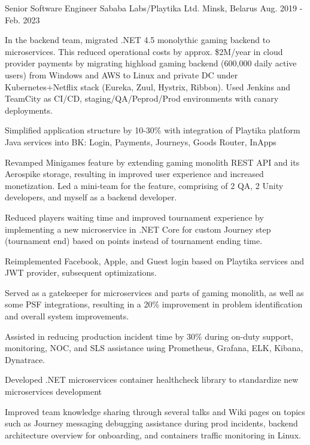 \begin{cventries}
  \cventry
    {Senior Software Engineer} %
    {Sababa Labs/Playtika Ltd.} %
    {Minsk, Belarus} %
    {Aug. 2019 - Feb. 2023} %
    {
      \begin{cvitems} %
        \item {In the backend team, migrated .NET 4.5 monolythic gaming backend to microservices. This reduced operational costs by approx. \$2M/year in cloud provider payments by migrating highload gaming backend (600,000 daily active users) from Windows and AWS to Linux and private DC under Kubernetes+Netflix stack (Eureka, Zuul, Hystrix, Ribbon). Used Jenkins and TeamCity as CI/CD, staging/QA/Peprod/Prod environments with canary deployments.}
        \item {Simplified application structure by 10-30\% with integration of Playtika platform Java services into BK: Login, Payments, Journeys, Goods Router, InApps}
        \item {Revamped Minigames feature by extending gaming monolith REST API and its Aerospike storage, resulting in improved user experience and increased monetization. Led a mini-team for the feature, comprising of 2 QA, 2 Unity developers, and myself as a backend developer.}
        \item {Reduced players waiting time and improved tournament experience by implementing a new microservice in .NET Core for custom Journey step (tournament end) based on points instead of tournament ending time.}
        \item {Reimplemented Facebook, Apple, and Guest login based on Playtika services and JWT provider, subsequent optimizations.}
        \item {Served as a gatekeeper for microservices and parts of gaming monolith, as well as some PSF integrations, resulting in a 20\% improvement in problem identification and overall system improvements.}
        \item {Assisted in reducing production incident time by 30\% during on-duty support, monitoring, NOC, and SLS assistance using Prometheus, Grafana, ELK, Kibana, Dynatrace.}
        \item {Developed .NET microservices container healthcheck library to standardize new microservices development}
        \item {Improved team knowledge sharing through several talks and Wiki pages on topics such as Journey messaging debugging assistance during prod incidents, backend architecture overview for onboarding, and containers traffic monitoring in Linux.}
      \end{cvitems}
    }


\end{cventries}
